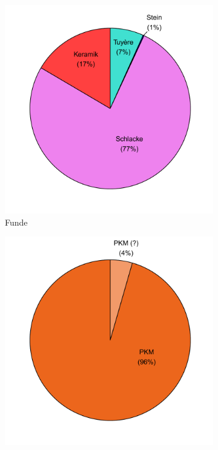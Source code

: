 \begin{figure}[p]
	\centering
	\begin{subfigure}[t]{0.3\textwidth}
		\centering
		\includegraphics[width = \textwidth]{fig/9-18_MUN87-3_Funde_R_modDS.pdf}
		\caption{Funde}
		\label{fig:MUNPIK87-3_FundeArt}
	\end{subfigure}\hfill
	\begin{subfigure}[t]{0.3\textwidth}
		\centering
		\includegraphics[width = \textwidth]{fig/9-18_MUN87-3_Stilgruppen_R_modDS.pdf}

\end{subfigure}
\end{figure}
